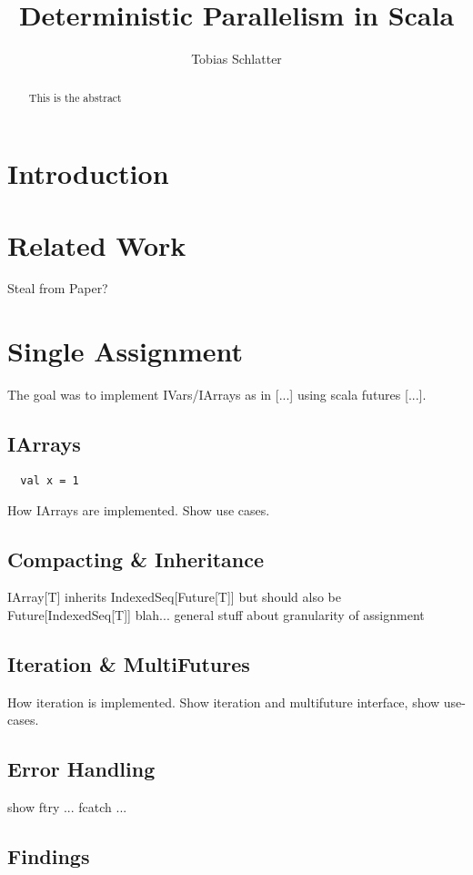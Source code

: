 \documentclass[fleqn]{scrartcl}
\title{Deterministic Parallelism in Scala}
\author{Tobias Schlatter}
\begin{document}
\maketitle

\begin{abstract}
  This is the abstract
\end{abstract}

\tableofcontents

\section{Introduction}

\section{Related Work}
Steal from Paper?

\section{Single Assignment}
The goal was to implement IVars/IArrays as in [...] using scala
futures [...].

\subsection{IArrays}
\begin{lstlisting}
  val x = 1
\end{lstlisting}
How IArrays are implemented. Show use cases.

\subsection{Compacting \& Inheritance}
IArray[T] inherits IndexedSeq[Future[T]] but should also be
Future[IndexedSeq[T]] blah... general stuff about granularity of
assignment

\subsection{Iteration \& MultiFutures}
How iteration is implemented. Show iteration and multifuture
interface, show use-cases.

\subsection{Error Handling}
show ftry { ... } fcatch { ... }

\subsection{Findings}
\end{document}
